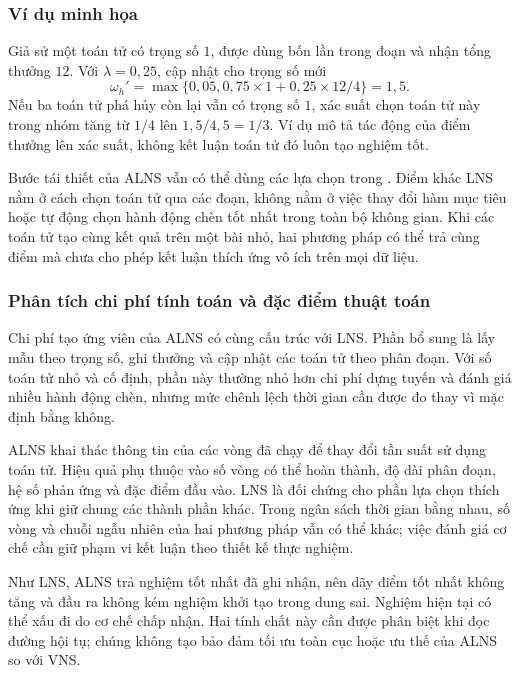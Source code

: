 \subsubsection{Ví dụ minh họa}
Giả sử một toán tử có trọng số $1$, được dùng bốn lần trong đoạn và nhận tổng thưởng $12$. Với $\lambda=0{,}25$, cập nhật cho trọng số mới
\begin{equation}
 \omega_h'=\max\{0{,}05,0{,}75\times1+0{,}25\times12/4\}=1{,}5.\label{eq:operator-weight-example}
\end{equation}
Nếu ba toán tử phá hủy còn lại vẫn có trọng số $1$, xác suất chọn toán tử này trong nhóm tăng từ $1/4$ lên $1{,}5/4{,}5=1/3$. Ví dụ mô tả tác động của điểm thưởng lên xác suất, không kết luận toán tử đó luôn tạo nghiệm tốt.

Bước tái thiết của ALNS vẫn có thể dùng các lựa chọn trong . Điểm khác LNS nằm ở cách chọn toán tử qua các đoạn, không nằm ở việc thay đổi hàm mục tiêu hoặc tự động chọn hành động chèn tốt nhất trong toàn bộ không gian. Khi các toán tử tạo cùng kết quả trên một bài nhỏ, hai phương pháp có thể trả cùng điểm mà chưa cho phép kết luận thích ứng vô ích trên mọi dữ liệu.

\subsubsection{Phân tích chi phí tính toán và đặc điểm thuật toán}
Chi phí tạo ứng viên của ALNS có cùng cấu trúc với LNS. Phần bổ sung là lấy mẫu theo trọng số, ghi thưởng và cập nhật các toán tử theo phân đoạn. Với số toán tử nhỏ và cố định, phần này thường nhỏ hơn chi phí dựng tuyến và đánh giá nhiều hành động chèn, nhưng mức chênh lệch thời gian cần được đo thay vì mặc định bằng không.

ALNS khai thác thông tin của các vòng đã chạy để thay đổi tần suất sử dụng toán tử. Hiệu quả phụ thuộc vào số vòng có thể hoàn thành, độ dài phân đoạn, hệ số phản ứng và đặc điểm đầu vào. LNS là đối chứng cho phần lựa chọn thích ứng khi giữ chung các thành phần khác. Trong ngân sách thời gian bằng nhau, số vòng và chuỗi ngẫu nhiên của hai phương pháp vẫn có thể khác; việc đánh giá cơ chế cần giữ phạm vi kết luận theo thiết kế thực nghiệm.

Như LNS, ALNS trả nghiệm tốt nhất đã ghi nhận, nên dãy điểm tốt nhất không tăng và đầu ra không kém nghiệm khởi tạo trong dung sai. Nghiệm hiện tại có thể xấu đi do cơ chế chấp nhận. Hai tính chất này cần được phân biệt khi đọc đường hội tụ; chúng không tạo bảo đảm tối ưu toàn cục hoặc ưu thế của ALNS so với VNS.

